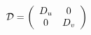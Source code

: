 \begin{equation}
{\cal{D}}=\left(
\begin{array}{cc}
D_{u} & 0 \\
0 & D_{v}
\end{array} \right)
\end{equation}

